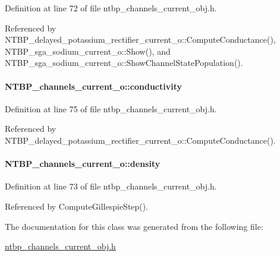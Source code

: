 Definition at line 72 of file ntbp\_\-channels\_\-current\_\-obj.h.



Referenced by NTBP\_\-delayed\_\-potassium\_\-rectifier\_\-current\_\-o::ComputeConductance(), NTBP\_\-sga\_\-sodium\_\-current\_\-o::Show(), and NTBP\_\-sga\_\-sodium\_\-current\_\-o::ShowChannelStatePopulation().

\paragraph[{conductivity}]{ {\bf NTBP\_\-channels\_\-current\_\-o::conductivity}}\hfill\label{class_n_t_b_p__channels__current__o_a9e93074869bcaabf578ca447196cccbb}


Definition at line 75 of file ntbp\_\-channels\_\-current\_\-obj.h.



Referenced by NTBP\_\-delayed\_\-potassium\_\-rectifier\_\-current\_\-o::ComputeConductance().

\paragraph[{density}]{ {\bf NTBP\_\-channels\_\-current\_\-o::density}}\hfill\label{class_n_t_b_p__channels__current__o_a8f486ec47e3aeef298a33b735758aa9f}


Definition at line 73 of file ntbp\_\-channels\_\-current\_\-obj.h.



Referenced by ComputeGillespieStep().



The documentation for this class was generated from the following file:\begin{DoxyCompactItemize}
\item 
\hyperlink{ntbp__channels__current__obj_8h}{ntbp\_\-channels\_\-current\_\-obj.h}\end{DoxyCompactItemize}
